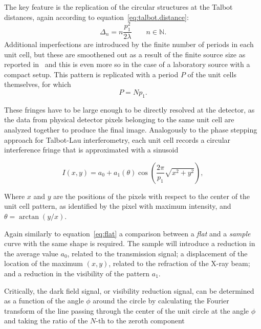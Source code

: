 The key feature is the replication of the circular structures 
at the Talbot distances, again according to
equation~\ref{eq:talbot.distance}:
\begin{equation*}
    \Delta_n = n \frac{p_1^2}{2 \lambda} \qquad n \in
    \mathbb{N}.
\end{equation*}
Additional imperfections are introduced by the finite number of periods in
each unit cell, but these are smoothened out as a result of the finite
source size as reported in~\cite{PhysRevLett.116.093902} and this is even
more so in the case of a laboratory source with a compact setup.
This pattern is replicated with a period $P$ of the unit cells themselves,
for which
\begin{equation}
    P = Np_1.
    \label{eq:unit.cell.periop}
\end{equation}

These fringes have to be large enough to be directly resolved at the
detector, as the data from physical detector pixels belonging to the same
unit cell are analyzed together to produce the final image. Analogously to
the phase stepping approach for Talbot-Lau interferometry, each unit cell
records a circular interference fringe that is approximated with a sinusoid

\begin{equation}
    I(x, y) = a_0 + a_1(\theta)\cos\left(\frac{2\pi}{p_1} \sqrt{x^2 +
    y^2}\right),
    \label{eq:omnidirectional.periodical.signal}
\end{equation}

Where $x$ and $y$ are the positions of the pixels with respect to the center
of the unit cell pattern, as identified by the pixel with maximum intensity,
and $\theta = \arctan(y/x)$.

Again similarly to equation~\ref{eq:flat} a comparison between a
\emph{flat} and a \emph{sample} curve with the same shape is required. The
sample will introduce a reduction in the average value $a_0$, related to the
transmission signal; a displacement of the location of the maximum $(x, y)$,
related to the refraction of the X-ray beam; and a reduction in the
visibility of the pattern $a_1$. 

Critically, the dark field signal, or visibility reduction signal, can be
determined as a function of the angle $\phi$ around the circle by calculating the
Fourier transform of the line passing through the center of the unit circle
at the angle $\phi$ and taking the ratio of the $N$-th to the zeroth component


